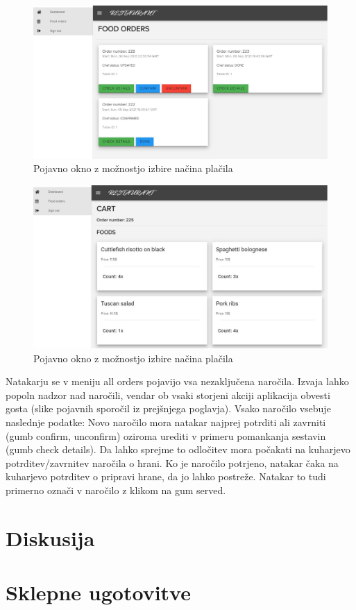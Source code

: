\documentclass[a4paper, 12pt]{book}
\begin{document}
\begin{figure}[!htb]
\begin{center}
\includegraphics[width=13cm]{kuhar_4.jpg}
\caption{Pojavno okno z možnostjo izbire načina plačila}
\label{Kuhar_4}
\end{center}
\end{figure}

\begin{figure}[!htb]
\begin{center}
\includegraphics[width=13cm]{kuhar_3.jpg}
\caption{Pojavno okno z možnostjo izbire načina plačila}
\label{Kuhar_3}
\end{center}
\end{figure}

Natakarju se v meniju all orders pojavijo vsa nezaključena naročila. Izvaja lahko popoln nadzor nad naročili, vendar ob vsaki storjeni akciji aplikacija obvesti gosta (slike pojavnih sporočil iz prejšnjega poglavja). Vsako naročilo vsebuje naslednje podatke: Novo naročilo mora natakar najprej potrditi ali zavrniti (gumb confirm, unconfirm) oziroma urediti v primeru pomankanja sestavin (gumb check details). Da lahko sprejme to odločitev mora počakati na kuharjevo potrditev/zavrnitev naročila o hrani. Ko je naročilo potrjeno, natakar čaka na kuharjevo potrditev o pripravi hrane, da jo lahko postreže. Natakar to tudi primerno označi v naročilo z klikom na gum served. 



\chapter {Diskusija}

\chapter {Sklepne ugotovitve}
\newpage %
\ \\
\clearpage
{}


\end{document}
